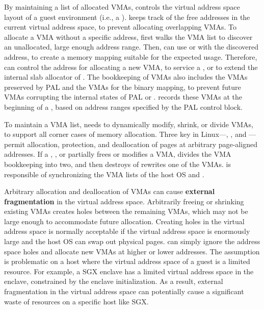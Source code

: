By maintaining a list of allocated VMAs,
\thelibos{} controls the virtual address space layout
of a guest environment (i.e., a \picoproc{}).
\thelibos{} keeps track of the free addresses in the current virtual address space,
to prevent allocating overlapping VMAs.
To allocate a VMA without a specific address,
\thelibos{} first walks the VMA list
to discover an unallocated, large enough address range.
Then, \thelibos{} can use  or  with the discovered address,
to create a memory mapping suitable for the expected usage.
Therefore, \thelibos{} can control the address
for allocating a new VMA,
to service a  \linuxapi{},
or to extend the internal slab allocator of \thelibos{}.
The bookkeeping of VMAs also includes
the VMAs preserved by PAL and the VMAs for the \thelibos{} binary mapping,
to prevent future VMAs
corrupting the internal states of PAL or \thelibos{}.
\thelibos{} records these VMAs at the beginning of a \picoproc{}, based on address ranges specified by the PAL control block.




To maintain a VMA list,
\thelibos{} needs to dynamically modify, shrink, or divide VMAs, to support all corner cases
of memory allocation.
Three key \linuxapis{} in Linux---, , and ---permit allocation, protection, and deallocation of pages
at arbitrary page-aligned addresses.
If a , , or  \linuxapi{}
partially frees or modifies a VMA,
\thelibos{} divides the VMA bookkeeping into two, and then destroys of rewrites one of the VMAs.
\thelibos{} is responsible of synchronizing the VMA lists of the host OS and \thelibos{}.



Arbitrary allocation and deallocation of VMAs can cause {\bf external fragmentation} in the virtual address space.
Arbitrarily freeing or shrinking existing VMAs
creates holes between the remaining VMAs, which may not be large enough
to accommodate future allocation.
Creating holes in the virtual address space
is normally acceptable if the virtual address space is enormously large and the host OS can swap out physical pages.
\thelibos{} can simply ignore the address space holes and
allocate new VMAs at higher or lower addresses. 
The assumption is problematic on a host where the virtual address space of
a guest is a limited resource.
For example, a SGX enclave has a limited virtual address space in the enclave, constrained by the enclave initialization.
As a result, external fragmentation in the virtual address space
can potentially cause a significant waste of resources on a specific host like SGX.


